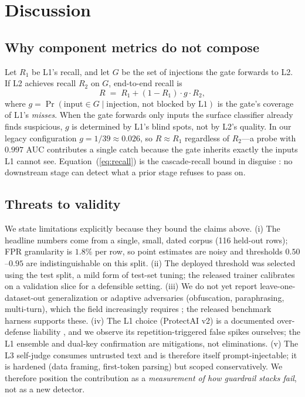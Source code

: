 \documentclass[conference]{IEEEtran}
\begin{document}
\section{Discussion}
\label{sec:discussion}

\subsection{Why component metrics do not compose}
\label{sec:compose}
Let $R_1$ be L1's recall, and let $G$ be the set of injections the gate
forwards to L2. If L2 achieves recall $R_2$ on $G$, end-to-end recall is
\begin{equation}
R \;=\; R_1 + (1 - R_1)\cdot g \cdot R_2,
\label{eq:recall}
\end{equation}
where $g = \Pr(\text{input} \in G \mid \text{injection, not blocked by L1})$
is the gate's coverage of L1's \emph{misses}. When the gate forwards only
inputs the surface classifier already finds suspicious, $g$ is determined by
L1's blind spots, not by L2's quality. In our legacy configuration
$g = 1/39 \approx 0.026$, so $R \approx R_1$ regardless of $R_2$---a probe
with $0.997$ AUC contributes a single catch because the gate inherits exactly
the inputs L1 cannot see. Equation~(\ref{eq:recall}) is the cascade-recall
bound in disguise \cite{viola2001,madras2018}: no downstream stage can detect
what a prior stage refuses to pass on.

\subsection{Threats to validity}
\label{sec:validity}
We state limitations explicitly because they bound the claims above. (i) The
headline numbers come from a single, small, dated corpus (116 held-out rows);
FPR granularity is $1.8\%$ per row, so point estimates are noisy and thresholds
$0.50$--$0.95$ are indistinguishable on this split. (ii) The deployed threshold
was selected using the test split, a mild form of test-set tuning; the released
trainer calibrates on a validation slice for a defensible setting. (iii) We do
not yet report leave-one-dataset-out generalization or adaptive adversaries
(obfuscation, paraphrasing, multi-turn), which the field increasingly requires
\cite{fomin2026,auc2026}; the released benchmark harness supports these.
(iv) The L1 choice (ProtectAI v2) is a documented over-defense liability
\cite{li2025}, and we observe its repetition-triggered false spikes ourselves;
the L1 ensemble and dual-key confirmation are mitigations, not eliminations.
(v) The L3 self-judge consumes untrusted text and is therefore itself
prompt-injectable; it is hardened (data framing, first-token parsing) but
scoped conservatively. We therefore position the contribution as a
\emph{measurement of how guardrail stacks fail}, not as a new detector.
\end{document}
